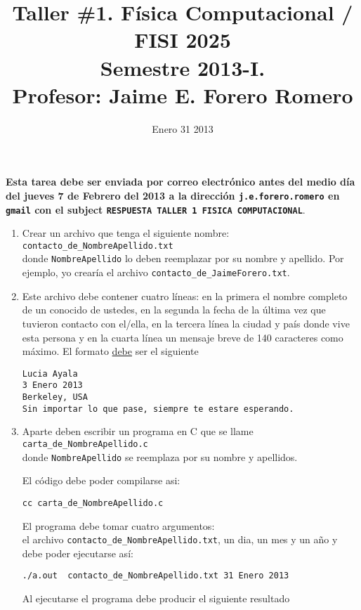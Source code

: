 \documentclass{article}
\title{Taller \#1. F\'isica Computacional / FISI 2025 \\Semestre 2013-I. \\ Profesor: Jaime E. Forero Romero}
\date{Enero 31 2013}
\begin{document}
\maketitle

{\bf Esta tarea debe ser enviada por correo electr\'onico antes del medio d\'ia del jueves 7 de Febrero del 2013 a la direcci\'on {\tt j.e.forero.romero} en {\tt gmail} con el subject \verb"RESPUESTA TALLER 1 FISICA COMPUTACIONAL"}.

\begin{enumerate}
\item
Crear un archivo que tenga el siguiente nombre:\\
\verb"contacto_de_NombreApellido.txt"\\
donde \verb"NombreApellido" lo deben reemplazar por su nombre y apellido. Por ejemplo, yo crear\'ia el archivo \verb"contacto_de_JaimeForero.txt".

\item
Este archivo debe contener cuatro l\'ineas: en la primera el nombre completo de un conocido de ustedes, en la segunda la fecha de la \'ultima vez que tuvieron contacto con el/ella, en la tercera l\'inea la ciudad y pa\'is donde vive esta persona y en la cuarta l\'inea un mensaje breve de 140 caracteres como m\'aximo.
El formato \underline{debe} ser el siguiente

\begin{verbatim}
Lucia Ayala
3 Enero 2013
Berkeley, USA
Sin importar lo que pase, siempre te estare esperando.
\end{verbatim}

\item
Aparte deben escribir un programa en C que se llame\\ \verb"carta_de_NombreApellido.c"\\ donde \verb"NombreApellido" se reemplaza por su nombre y apellidos. 

El c\'odigo debe poder compilarse asi:
\begin{verbatim}
cc carta_de_NombreApellido.c
\end{verbatim}


El programa debe tomar cuatro argumentos:\\
 el archivo \verb"contacto_de_NombreApellido.txt", un dia, un mes y un a\~no y debe poder ejecutarse as\'i:
\begin{verbatim}
./a.out  contacto_de_NombreApellido.txt 31 Enero 2013
\end{verbatim}

Al ejecutarse el programa debe producir el siguiente resultado


\end{enumerate}
\end{document}
